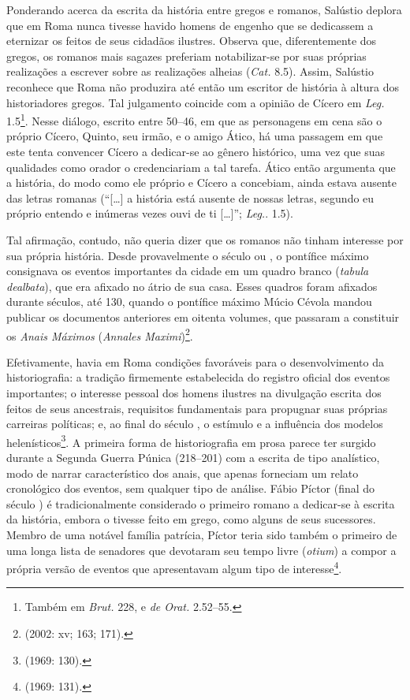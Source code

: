  Ponderando acerca da escrita da história entre gregos e romanos, Salústio
 deplora que em Roma nunca tivesse havido homens de engenho que se dedicassem a
 eternizar os feitos de seus cidadãos ilustres. Observa que, diferentemente dos
 gregos, os romanos mais sagazes preferiam notabilizar-se por suas próprias
 realizações a escrever sobre as realizações alheias (\emph{Cat.} 8.5). Assim,
 Salústio reconhece que Roma não produzira até então um escritor de história à
 altura dos historiadores gregos. Tal julgamento coincide com a opinião de
 Cícero em \emph{Leg.} 1.5\footnote{Também em \emph{Brut.} 228, e
 \emph{de Orat.} 2.52--55.}.  Nesse diálogo, escrito entre
 50--46, em que as personagens em cena são o próprio Cícero, Quinto, seu irmão,
 e o amigo Ático, há uma passagem em que este tenta convencer Cícero a
 dedicar-se ao gênero histórico, uma vez que suas qualidades como orador o
 credenciariam a tal tarefa.  Ático então argumenta que a história, do modo
 como ele próprio e Cícero a concebiam, ainda estava ausente das letras romanas
 (“[\ldots{}] a história está ausente de nossas letras, segundo eu próprio entendo e
 inúmeras vezes ouvi de ti [\ldots{}]”;  \emph{Leg.}. 1.5). 

Tal afirmação, contudo, não queria dizer que os romanos não tinham interesse
por sua própria história. Desde provavelmente o século  ou , o  
pontífice máximo consignava os eventos importantes da cidade em um quadro branco
(\emph{tabula dealbata}), que era afixado no átrio de sua casa. Esses quadros
foram afixados durante séculos, até 130,  quando o  pontífice máximo Múcio
Cévola mandou publicar os documentos anteriores em oitenta volumes, que
passaram a constituir os \emph{Anais Máximos} (\emph{Annales
Maximi})\footnote{ (2002: xv; 163; 171).}. 

Efetivamente, havia em Roma condições favoráveis para o desenvolvimento da
historiografia: a tradição firmemente estabelecida do registro oficial dos
eventos importantes; o interesse pessoal dos homens ilustres na divulgação
escrita dos feitos de seus ancestrais, requisitos fundamentais para propugnar
suas próprias carreiras políticas; e, ao final do século , o estímulo
e a influência dos modelos helenísticos\footnote{ (1969: 130).}.    A
primeira forma de historiografia em prosa parece ter surgido durante a Segunda
Guerra Púnica (218--201) com a escrita de tipo analístico, modo de narrar
característico dos anais, que apenas forneciam um relato cronológico dos
eventos, sem qualquer tipo de análise. Fábio Píctor (final do século ) 
é tradicionalmente considerado o primeiro romano a dedicar-se à escrita da história,
embora o tivesse feito em grego, como alguns de seus sucessores. Membro de uma
notável família patrícia, Píctor teria sido também o primeiro de uma longa
lista de senadores que devotaram seu tempo livre (\emph{otium}) a compor a
própria versão de eventos que apresentavam algum tipo de
interesse\footnote{ (1969: 131).}.

